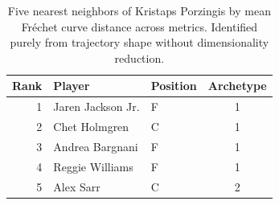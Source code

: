 \begin{table}[htbp]
  \centering\small
  \begin{tabular}{rllc}
    \toprule
    Rank & Player & Position & Archetype \\
    \midrule
    1 & Jaren Jackson Jr. & F & 1 \\
    2 & Chet Holmgren & C & 1 \\
    3 & Andrea Bargnani & F & 1 \\
    4 & Reggie Williams & F & 1 \\
    5 & Alex Sarr & C & 2 \\
    \bottomrule
  \end{tabular}
  \caption{Five nearest neighbors of Kristaps Porzingis by mean Fr\'{e}chet curve distance across metrics. Identified purely from trajectory shape without dimensionality reduction.}
  \label{tab:Kristaps_Porzingis_frechet_curve_neighbors}
\end{table}

